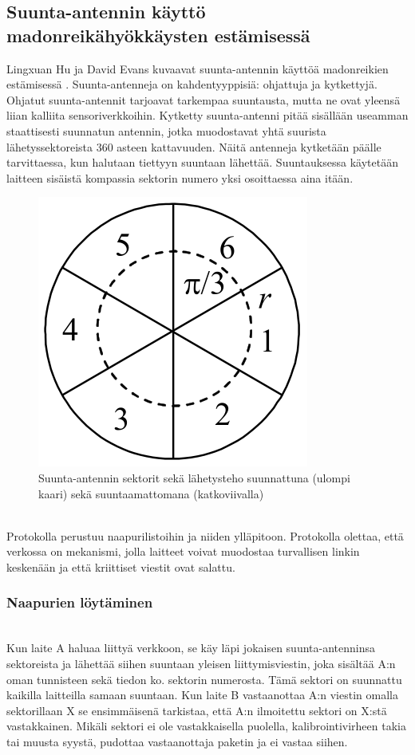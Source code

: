 \documentclass[finnish]{tktltiki2}
\theoremstyle{definition}
\theoremstyle{remark}
\begin{document}
% 
% 
% 
% 
% 
% 
\subsection{Suunta-antennin käyttö madonreikähyökkäysten estämisessä}
% 
% 
% 
% 
% 
% 
% 
% 
% 
% 
Lingxuan Hu ja David Evans kuvaavat suunta-antennin käyttöä madonreikien estämisessä \cite{antenna}. Suunta-antenneja on kahdentyyppisiä: ohjattuja ja kytkettyjä. Ohjatut suunta-antennit tarjoavat tarkempaa suuntausta, mutta ne ovat yleensä liian kalliita sensoriverkkoihin. Kytketty suunta-antenni pitää sisällään useamman staattisesti suunnatun antennin, jotka muodostavat yhtä suurista lähetyssektoreista 360 asteen kattavuuden. Näitä antenneja kytketään päälle tarvittaessa, kun halutaan tiettyyn suuntaan lähettää. Suuntauksessa käytetään laitteen sisäistä kompassia sektorin numero yksi osoittaessa aina itään.

\begin{figure}[h]
  \centering
  \includegraphics[width=0.25\linewidth]{directional-antenna-layout}
  \caption{Suunta-antennin sektorit sekä lähetysteho suunnattuna (ulompi kaari) sekä suuntaamattomana (katkoviivalla) \cite{antenna}}
  \label{fig:directional-layout}
\end{figure}

\noindent \\
Protokolla perustuu naapurilistoihin ja niiden ylläpitoon. Protokolla olettaa, että verkossa on mekanismi, jolla laitteet voivat muodostaa turvallisen linkin keskenään ja että kriittiset viestit ovat salattu.

\subsubsection{Naapurien löytäminen}
\noindent\\
Kun laite A haluaa liittyä verkkoon, se käy läpi jokaisen suunta-antenninsa sektoreista ja lähettää siihen suuntaan yleisen liittymisviestin, joka sisältää A:n oman tunnisteen sekä tiedon ko. sektorin numerosta. Tämä sektori on suunnattu kaikilla laitteilla samaan suuntaan. Kun laite B vastaanottaa A:n viestin omalla sektorillaan X se ensimmäisenä tarkistaa, että A:n ilmoitettu sektori on X:stä vastakkainen. Mikäli sektori ei ole vastakkaisella puolella, kalibrointivirheen takia tai muusta syystä, pudottaa vastaanottaja paketin ja ei vastaa siihen.
\end{document}
